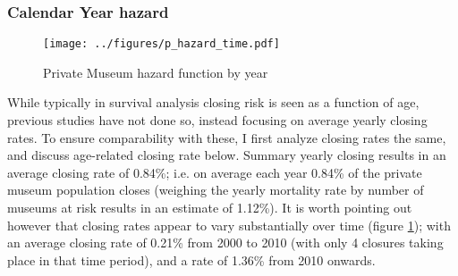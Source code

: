 \documentclass[12pt]{article}
\begin{document}
\subsubsection*{Calendar Year hazard}

\begin{figure}[htbp]
\centering
\texttt{[image: ../figures/p\_hazard\_time.pdf]}
\caption{\label{fig:p_hazard_time}Private Museum hazard function by year}
\end{figure}

While typically in survival analysis closing risk is seen as a function of age, previous studies have not done so, instead focusing on average yearly closing rates.
To ensure comparability with these, I first analyze closing rates the same, and discuss age-related closing rate below.
Summary yearly closing results in an average closing rate of 0.84\%; i.e. on average each year 0.84\% of the private museum population closes (weighing the yearly mortality rate by number of museums at risk results in an estimate of 1.12\%).
It is worth pointing out however that closing rates appear to vary substantially over time (figure \ref{fig:p_hazard_time}); with an average closing rate of 0.21\% from 2000 to 2010 (with only 4 closures taking place in that time period), and a rate of 1.36\% from 2010 onwards.
\end{document}
